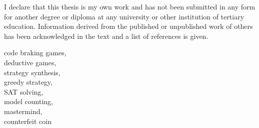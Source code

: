 









\FrontMatter
\setlength{\parindent}{0pt}
\ThesisTitlePage


\begin{ThesisDeclaration}
I declare that this thesis is my own work and has not been submitted
in any form for another degree or diploma at any university or
other institution of tertiary education. Information derived from the published
or unpublished work of others has been acknowledged in the text
and a list of references is given.

\AdvisorName
\end{ThesisDeclaration}




\begin{ThesisKeyWords}
code braking games, \\
deductive games,\\
strategy synthesis, \\
greedy strategy,\\
SAT solving,\\
model counting, \\
mastermind, \\
counterfeit coin\\
\end{ThesisKeyWords}


